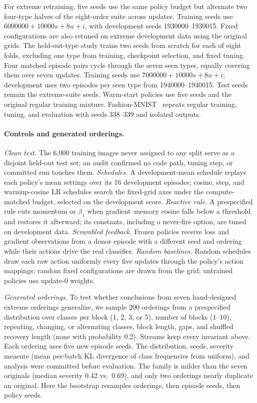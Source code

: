 \documentclass{article}
\begin{document}
For extreme retraining, five seeds use the same policy budget but alternate two four-type halves of the eight-order suite across updates. Training seeds use $6000000+10000s+8u+i$, with development seeds 1930000--1930015. Fixed configurations are also retuned on extreme development data using the original grids. The held-out-type study trains two seeds from scratch for each of eight folds, excluding one type from training, checkpoint selection, and fixed tuning. Four matched episode pairs cycle through the seven seen types, equally covering them over seven updates. Training seeds use $7000000+10000s+8u+i$; development uses two episodes per seen type from 1940000--1940015. Test seeds remain the extreme-suite seeds. Warm-start policies use five seeds and the original regular training mixture. Fashion-MNIST~\cite{xiao2017} repeats regular training, tuning, and evaluation with seeds 338--339 and isolated outputs.


\paragraph{Controls and generated orderings.}
\emph{Clean test.} The 6,000 training images never assigned to any split serve as a disjoint held-out test set; an audit confirmed no code path, tuning step, or committed run touches them. \emph{Schedules.} A development-mean schedule replays each policy's mean settings over its 16 development episodes; cosine, step, and warmup-cosine LR schedules search the fixed-grid axes under the compute-matched budget, selected on the development score. \emph{Reactive rule.} A prespecified rule cuts momentum or $\beta_1$ when gradient--memory cosine falls below a threshold and restores it afterward; its constants, including a never-fire option, are tuned on development data. \emph{Scrambled feedback.} Frozen policies receive loss and gradient observations from a donor episode with a different seed and ordering while their actions drive the real classifier. \emph{Random baselines.} Random schedules draw each raw action uniformly every five updates through the policy's action mappings; random fixed configurations are drawn from the grid; untrained policies use update-0 weights.

\emph{Generated orderings.} To test whether conclusions from seven hand-designed extreme orderings generalize, we sample 200 orderings from a prespecified distribution over classes per block (1, 2, 3, or 5), number of blocks (1--10), repeating, changing, or alternating classes, block length, gaps, and shuffled recovery length (none with probability 0.2). Streams keep every invariant above. Each ordering uses five new episode seeds. The distribution, seeds, severity measure (mean per-batch KL divergence of class frequencies from uniform), and analysis were committed before evaluation. The family is milder than the seven originals (median severity 0.42 vs.\ 0.69), and only two orderings nearly duplicate an original. Here the bootstrap resamples orderings, then episode seeds, then policy seeds.
\end{document}
